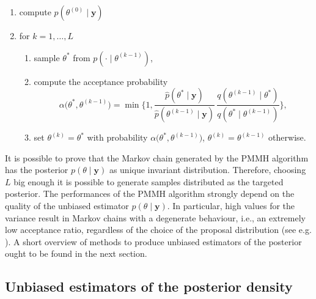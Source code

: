 \documentclass[10pt]{article}
\begin{document}
\begin{enumerate}[label=\textit{\alph*})]
	\item compute $p(\theta^{(0)} \mid \mathbf y)$ 
	\item\label{it:extForMH} for $k = 1, \ldots, L$
	\begin{enumerate}[label=\ref{it:extForMH}.\arabic*)]
		\item sample $\theta^*$ from $p(\cdot \mid \theta^{(k-1)})$,
		\item compute the acceptance probability
		\begin{equation}
			\alpha\big(\theta^*, \theta^{(k-1)}\big) = \min\Big\{1, \frac{\hat p(\theta^* \mid \mathbf y)}{\hat p(\theta^{(k-1)} \mid \mathbf y)} \, \frac{q(\theta^{(k-1)} \mid \theta^*)}{q(\theta^* \mid \theta^{(k-1)})}\Big\},
		\end{equation}
		\item set $\theta^{(k)} = \theta^*$ with probability $\alpha\big(\theta^*, \theta^{(k-1)}\big)$, $\theta^{(k)} = \theta^{(k-1)}$ otherwise.
	\end{enumerate}
\end{enumerate}
It is possible to prove \cite{AnR09} that the Markov chain generated by the PMMH algorithm has the posterior $p(\theta \mid \mathbf y)$ as unique invariant distribution. Therefore, choosing $L$ big enough it is possible to generate samples distributed as the targeted posterior. The performances of the PMMH algorithm strongly depend on the quality of the unbiased estimator $\hat p(\theta \mid \mathbf y)$. In particular, high values for the variance result in Markov chains with a degenerate behaviour, i.e., an extremely low acceptance ratio, regardless of the choice of the proposal distribution (see e.g. \cite{DPD15}). A short overview of methods to produce unbiased estimators of the posterior ought to be found in the next section.

\subsection{Unbiased estimators of the posterior density}
\end{document}
